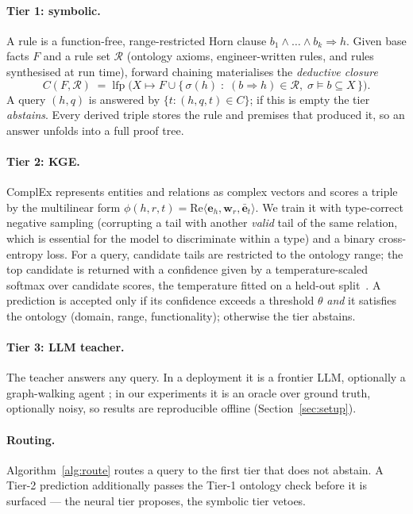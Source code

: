 \documentclass[11pt]{article}
\theoremstyle{plain}
\begin{document}
\paragraph{Tier 1: symbolic.} A rule is a function-free, range-restricted
Horn clause $b_1\wedge\dots\wedge b_k \Rightarrow h$. Given base facts $F$
and a rule set $\mathcal{R}$ (ontology axioms, engineer-written rules, and
rules synthesised at run time), forward chaining materialises the
\emph{deductive closure}
\[
  C(F,\mathcal{R}) \;=\; \mathrm{lfp}\;\big(X \mapsto F \cup
  \{\,\sigma(h)\;:\; (b\Rightarrow h)\in\mathcal{R},\;
  \sigma\models b \subseteq X\,\}\big).
\]
A query $(h,q)$ is answered by $\{t:(h,q,t)\in C\}$; if this is empty the
tier \emph{abstains}. Every derived triple stores the rule and premises
that produced it, so an answer unfolds into a full proof tree.

\paragraph{Tier 2: KGE.} ComplEx represents entities and relations as
complex vectors and scores a triple by the multilinear form
$\phi(h,r,t)=\mathrm{Re}\langle \mathbf{e}_h,\mathbf{w}_r,
\bar{\mathbf{e}}_t\rangle$. We train it with type-correct negative sampling
(corrupting a tail with another \emph{valid} tail of the same relation,
which is essential for the model to discriminate within a type) and a
binary cross-entropy loss. For a query, candidate tails are restricted to
the ontology range; the top candidate is returned with a confidence given
by a temperature-scaled softmax over candidate scores, the temperature
fitted on a held-out split~\citep{guo2017calibration}. A prediction is
accepted only if its confidence exceeds a threshold $\theta$ \emph{and} it
satisfies the ontology (domain, range, functionality); otherwise the tier
abstains.

\paragraph{Tier 3: LLM teacher.} The teacher answers any query. In a
deployment it is a frontier LLM, optionally a graph-walking agent
\citep{sun2024tog}; in our experiments it is an oracle over ground truth,
optionally noisy, so results are reproducible offline (Section~\ref{sec:setup}).

\paragraph{Routing.} Algorithm~\ref{alg:route} routes a query to the first
tier that does not abstain. A Tier-2 prediction additionally passes the
Tier-1 ontology check before it is surfaced --- the neural tier proposes,
the symbolic tier vetoes.
\end{document}
